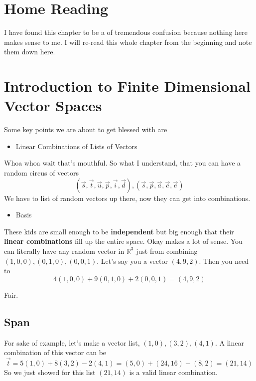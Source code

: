 \documentclass[letter]{article}
\begin{document}
\section{Home Reading} 
I have found this chapter to be a of tremendous confusion because nothing here makes sense to me. I will re-read this whole chapter from the beginning and note them down here. 

\section*{Introduction to Finite Dimensional Vector Spaces} 
Some key points we are about to get blessed with are
\begin{itemize}
	\item Linear Combinations of Lists of Vectors		
\end{itemize}
Whoa whoa wait that's mouthful. So what I understand, that you can have a random circus of vectors 
\[
	(\vec{s}, \vec{t}, \vec{u}, \vec{p}, \vec{i}, \vec{d}), (\vec{s}, \vec{p}, \vec{a}, \vec{c}, \vec{e})
\] We have to list of random vectors up there, now they can get into combinations.  
\begin{itemize}
	\item Basis	
\end{itemize}
These kids are small enough to be \textbf{independent} but big enough that their \textbf{linear combinations} fill up the entire space. Okay makes a lot of sense. You can literally have any random vector in $\mathbb{R}^3$ just from combining $(1,0,0),(0,1,0),(0,0,1)$. Let's say you a vector $(4,9,2)$. Then you need to
\[
4(1,0,0) + 9(0,1,0) + 2(0,0,1) = (4,9,2)
\]

Fair. 

\subsection*{Span}


For sake of example, let's make a vector list, $(1,0), (3,2), (4,1)$. A linear combination of this vector can be \[
\vec{t} = 5(1,0) + 8(3,2) - 2(4,1) = (5,0) + (24, 16) - (8, 2) = (21, 14) 
\]
So we just showed for this list $(21, 14)$ is a valid linear combination. 
\end{document}
